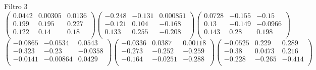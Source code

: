 Filtro 3
{ \small
\[
\begin{pmatrix}
  0.0442 & 0.00305 & 0.0136 \\
  0.199 & 0.195 & 0.227 \\
  0.122 & 0.14 & 0.18 \\
\end{pmatrix}
\begin{pmatrix}
  -0.248 & -0.131 & 0.000851 \\
  -0.121 & 0.104 & -0.168 \\
  0.133 & 0.255 & -0.208 \\
\end{pmatrix}
\begin{pmatrix}
  0.0728 & -0.155 & -0.15 \\
  0.13 & -0.149 & -0.0966 \\
  0.143 & 0.28 & 0.198 \\
\end{pmatrix}
\]
\[
\begin{pmatrix}
  -0.0865 & -0.0534 & 0.0543 \\
  -0.323 & -0.23 & -0.0358 \\
  -0.0141 & -0.00864 & 0.0429 \\
\end{pmatrix}
\begin{pmatrix}
  -0.0336 & 0.0387 & 0.00118 \\
  -0.273 & -0.252 & -0.259 \\
  -0.164 & -0.0251 & -0.288 \\
\end{pmatrix}
\begin{pmatrix}
  -0.0525 & 0.229 & 0.289 \\
  -0.38 & 0.0473 & 0.216 \\
  -0.228 & -0.265 & -0.414 \\
\end{pmatrix}
\]
}

